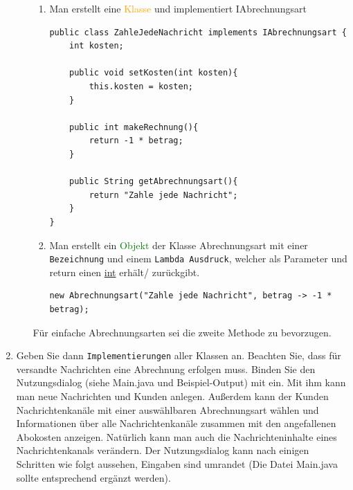 \documentclass{article}
\newcommand{\gqq}[1]{\glqq{}#1\grqq{}}
\begin{document}
\begin{enumerate}[label=\alph*.]
\begin{itemize}
                    \begin{enumerate}[label=\arabic*.]
                        \item Man erstellt eine \textcolor{orange}{Klasse} und implementiert \gqq{IAbrechnungsart}

                        \begin{verbatim}
public class ZahleJedeNachricht implements IAbrechnungsart {
    int kosten;

    public void setKosten(int kosten){
        this.kosten = kosten;
    }

    public int makeRechnung(){
        return -1 * betrag;
    }

    public String getAbrechnungsart(){
        return "Zahle jede Nachricht";
    }
}
                        \end{verbatim}

                        \item Man erstellt ein \textcolor{green}{Objekt} der Klasse \gqq{Abrechnungsart} mit einer \texttt{Bezeichnung} und einem \texttt{Lambda Ausdruck}, welcher als Parameter und return einen \underline{int} erhält/ zurückgibt.

                            \begin{verbatim}
new Abrechnungsart("Zahle jede Nachricht", betrag -> -1 * betrag);
                            \end{verbatim}
                    \end{enumerate}

                    Für \gqq{einfache} Abrechnungsarten sei die zweite Methode zu bevorzugen.
            \end{itemize}
            
        \newpage
        \item Geben Sie dann \texttt{Implementierungen} aller Klassen an.
        Beachten Sie, dass für versandte Nachrichten eine Abrechnung erfolgen muss.
        Binden Sie den Nutzungsdialog (siehe Main.java und Beispiel-Output) mit ein.
        Mit ihm kann man neue Nachrichten und Kunden anlegen.
        Außerdem kann der Kunden Nachrichtenkanäle mit einer auswählbaren Abrechnungsart wählen und Informationen über alle Nachrichtenkanäle zusammen mit den angefallenen Abokosten anzeigen.
        Natürlich kann man auch die Nachrichteninhalte eines Nachrichtenkanals verändern. Der Nutzungsdialog kann nach einigen Schritten wie folgt aussehen, Eingaben sind umrandet (Die Datei Main.java sollte entsprechend ergänzt werden). 


\end{enumerate}
\end{document}
